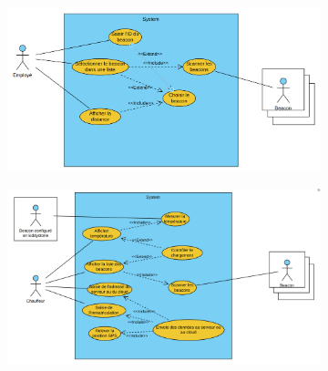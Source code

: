\documentclass[10pt,a4paper]{article}
\begin{document}
\begin{figure}[h!]
    \centering
    \begin{subfigure}[b]{0.45\textwidth}
        \centering
        \includegraphics[scale=0.14]{Images/recherche_actif.png}
        \caption{}
        \label{recherche_actif.png2}
    \end{subfigure}
    \begin{subfigure}[b]{0.45\textwidth}
        \includegraphics[scale=0.14]{Images/controle_chargement.png}
        \caption{}
        \label{controle_chargement.png2}
    \end{subfigure}
    \caption{}
\end{figure}
\end{document}
